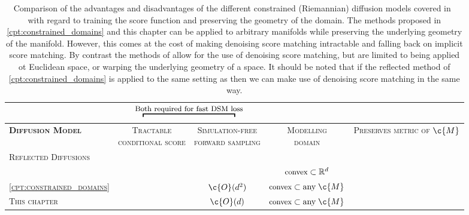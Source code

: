 \begin{table}[t]
	\centering
	\small
	\caption{Comparison of the advantages and disadvantages of the different constrained (Riemannian) diffusion models covered in~ with regard to training the score function and preserving the geometry of the domain. The methods proposed in \cref{cpt:constrained_domains} and this chapter can be applied to arbitrary manifolds while preserving the underlying geometry of the manifold. However, this comes at the cost of making denoising score matching intractable and falling back on implicit score matching. By contrast the methods of \textcite{lou2023reflected,liu2024mirror} allow for the use of denoising score matching, but are limited to being applied ot Euclidean space, or warping the underlying geometry of a space. It should be noted that if the reflected method of \cref{cpt:constrained_domains} is applied to the same setting as \textcite{lou2023reflected} then we can make use of denoising score matching in the same way.}
	\label{tab:general_method_comparison2}
	\vspace{1em}
	\begin{tabular}{lcccc}
		& \multicolumn{2}{c}{\(\overbracket{\mspace{200mu}}^{\text{\small Both required for fast DSM loss}}\)} &  & \\
		\toprule
		\scshape \bfseries Diffusion Model & \scshape \thead[c]{Tractable \\conditional score} & \scshape \thead[c]{Simulation-free\\forward sampling} & \scshape \thead[c]{Modelling                            \\domain}  & \scshape \thead[c]{Preserves\\metric of \(\c{M}\)} \\
		\midrule
		\scshape Reflected Diffusions                                                                                               \\
		\quad\scshape \textcite{lou2023reflected}         & \cmark                    & \cmark & \(\text{\small convex}\;{\subset}\;\mathbb{R}^d\)       & \xmark \\
		\quad\scshape \cref{cpt:constrained_domains}  & \xmark                    & \color{black!50!red}\(\c{O}(d^2)\) & \(\text{\small convex}\;{\subset}\;\text{any}\;\c{M}\)           & \cmark \\
		\quad\scshape This chapter & \xmark                    & \color{black!50!red}\(\c{O}(d)\) & \(\text{\small convex}\;{\subset}\;\text{any}\;\c{M}\)             & \cmark \\


\end{tabular}
\end{table}
